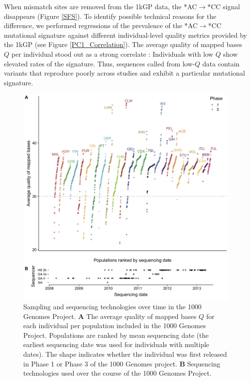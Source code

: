 \documentclass[9pt,article]{template}
\begin{document}
When mismatch sites are removed from the 1kGP data, the  *AC${\rightarrow}$*CC signal disappears (Figure \ref{SFS}). To identify possible technical reasons for the difference, we performed regressions of the prevalence of the  *AC${\rightarrow}$*CC mutational signature against different individual-level quality metrics provided by the 1kGP (see Figure \ref{PC1_Correlation}). 
The average quality of mapped bases  $Q$ per individual stood out as a strong correlate : Individuals with low $Q$ show elevated rates of the signature. 
Thus, sequences called from low-$Q$ data contain variants that reproduce poorly across studies and exhibit a particular mutational signature. 

\begin{figure}
\includegraphics[width=0.95\hsize,keepaspectratio]{../Figures/MapQualOverTime.jpg}

\caption{Sampling and sequencing technologies over time in the 1000 Genomes Project.
\textbf{A} The average quality of mapped bases $Q$ for each individual per population included in the 1000 Genomes Project. 
 Populations are ranked by mean sequencing date (the earliest sequencing date was used for individuals with multiple dates). 
The shape indicates whether the individual was first released in Phase 1 or Phase 3 of the 1000 Genomes project. 
\textbf{B} Sequencing technologies used over the course of the 1000 Genomes Project.}
\label{MapQual}
\end{figure}
\end{document}
